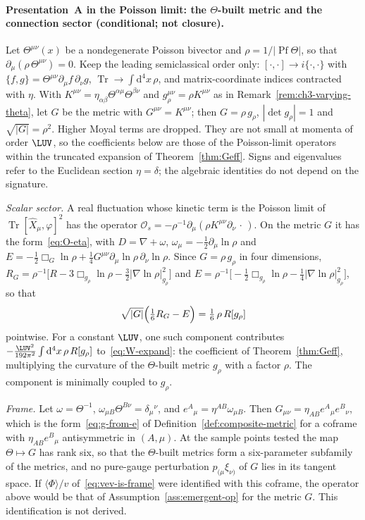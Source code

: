\paragraph{Presentation~A in the Poisson limit: the \(\Theta\)-built metric and the connection sector (conditional; not closure).}
Let \(\Theta^{\mu\nu}(x)\) be a nondegenerate Poisson bivector and
\(\rho=1/|\operatorname{Pf}\Theta|\), so that
\(\partial_\mu(\rho\,\Theta^{\mu\nu})=0\). Keep the leading
semiclassical order only:
\([\cdot,\cdot]\to i\{\cdot,\cdot\}\) with
\(\{f,g\}=\Theta^{\mu\nu}\partial_\mu f\,\partial_\nu g\),
\(\operatorname{Tr}\to\int\mathrm{d}^4x\,\rho\), and matrix-coordinate
indices contracted with \(\eta\). With
\(K^{\mu\nu}=\eta_{\alpha\beta}\Theta^{\alpha\mu}\Theta^{\beta\nu}\) and
\(g_\rho^{\mu\nu}=\rho K^{\mu\nu}\) as in
Remark~\ref{rem:ch3-varying-theta}, let \(G\) be the metric with
\(G^{\mu\nu}=K^{\mu\nu}\); then \(G=\rho\,g_\rho\),
\(|\det g_\rho|=1\) and \(\sqrt{|G|}=\rho^2\). Higher Moyal terms are
dropped. They are not small at momenta of order \(\LUV\), so the
coefficients below are those of the Poisson-limit operators within the
truncated expansion of Theorem~\ref{thm:Geff}. Signs and eigenvalues
refer to the Euclidean section \(\eta=\delta\); the algebraic identities
do not depend on the signature.

\emph{Scalar sector.} A real fluctuation whose kinetic term is the
Poisson limit of \(\operatorname{Tr}[\hat X_\mu,\varphi]^2\) has the
operator
\(\mathcal O_s=-\rho^{-1}\partial_\mu(\rho K^{\mu\nu}\partial_\nu\,\cdot\,)\).
On the metric \(G\) it has the form~\eqref{eq:O-eta}, with
\(D=\nabla+\omega\), \(\omega_\mu=-\tfrac12\partial_\mu\ln\rho\) and
\(E=-\tfrac12\Box_G\ln\rho
+\tfrac14G^{\mu\nu}\partial_\mu\ln\rho\,\partial_\nu\ln\rho\).
Since \(G=\rho\,g_\rho\) in four dimensions,
\(R_G=\rho^{-1}\bigl[R-3\Box_{g_\rho}\ln\rho
-\tfrac32|\nabla\ln\rho|^2_{g_\rho}\bigr]\) and
\(E=\rho^{-1}\bigl[-\tfrac12\Box_{g_\rho}\ln\rho
-\tfrac14|\nabla\ln\rho|^2_{g_\rho}\bigr]\), so that
\[
  \sqrt{|G|}\Bigl(\tfrac16R_G-E\Bigr)=\tfrac16\,\rho\,R[g_\rho]
\]
pointwise. For a constant \(\LUV\), one such component contributes
\(-\tfrac{\LUV^2}{192\pi^2}\int\mathrm{d}^4x\,\rho\,R[g_\rho]\)
to~\eqref{eq:W-expand}: the coefficient of
Theorem~\ref{thm:Geff}, multiplying the curvature of the
\(\Theta\)-built metric \(g_\rho\) with a factor \(\rho\). The
component is minimally coupled to \(g_\rho\).

\emph{Frame.} Let \(\omega=\Theta^{-1}\), \(\omega_{\mu B}\Theta^{B\nu}
=\delta_\mu{}^\nu\), and \(e^A{}_\mu=\eta^{AB}\omega_{\mu B}\). Then
\(G_{\mu\nu}=\eta_{AB}e^A{}_\mu e^B{}_\nu\), which is the
form~\eqref{eq:g-from-e} of Definition~\ref{def:composite-metric} for
a coframe with \(\eta_{AB}e^B{}_\mu\) antisymmetric in \((A,\mu)\).
At the sample points tested the map \(\Theta\mapsto G\) has rank six,
so that the \(\Theta\)-built metrics form a six-parameter subfamily of
the metrics, and no pure-gauge perturbation
\(p_{(\mu}\xi_{\nu)}\) of \(G\) lies in its tangent space. If
\(\langle\Phi\rangle/v\) of~\eqref{eq:vev-is-frame} were identified with
this coframe, the operator above would be that of
Assumption~\ref{ass:emergent-op} for the metric \(G\). This
identification is not derived.


